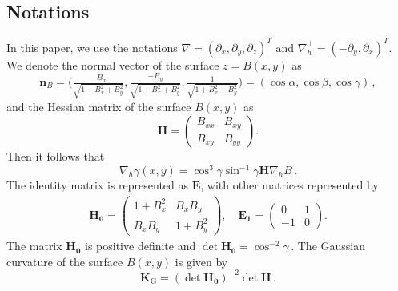 \documentclass[pdflatex,sn-mathphys-num]{sn-jnl}%
\theoremstyle{thmstyleone}%
\theoremstyle{thmstyletwo}%
\theoremstyle{thmstylethree}%
\theoremstyle{thmstyletwo}
\begin{document}
\subsection{Notations}\label{subsec1.1}
In this paper, we use the notations $\nabla=(\partial_x,\partial_y,\partial_z)^T$ and $\nabla^\bot_h=(-\partial_y,\partial_x)^T$. 
We denote the normal vector of the surface $z=B(x,y)$ as
\begin{equation*}
	{\boldsymbol n}_{B}=\Big(\tfrac{-B_x}{\sqrt{1+B_x^2+B_y^2}}, \tfrac{-B_y}{\sqrt{1+B_x^2+B_y^2}},\tfrac{1}{\sqrt{1+B_x^2+B_y^2}}\Big) =(\cos \alpha,\cos \beta,\cos\gamma)\,,
\end{equation*}
and the Hessian matrix of the surface $B(x,y)$  as
\begin{equation*}
	\boldsymbol{H}=\begin{pmatrix}
		B_{xx}&  B_{xy}\\
		B_{xy} & B_{yy}
	\end{pmatrix}.
\end{equation*}
Then it follows that
\begin{equation*}
	\nabla_{ h}\gamma(x,y)={\cos^3\gamma}{\sin^{-1}\gamma}\boldsymbol{H}\nabla_{ h}B\,.
\end{equation*}
The identity matrix is represented as $\boldsymbol{E}$, with other matrices represented by
\begin{align*}
	\boldsymbol{H_0}=
	\begin{pmatrix}
		1+B_x^2& B_xB_y\\
		B_xB_y& 1+B_y^2
	\end{pmatrix},
	\quad
	\boldsymbol{E_1}=
	\begin{pmatrix}
		0&1\\
		-1& 0
	\end{pmatrix}.
\end{align*}
The matrix $ \boldsymbol{H_0} $ is  positive definite and
$
	\det \boldsymbol{H_0}=\cos^{-2}\gamma\,.
$
The Gaussian curvature of the surface $ B(x,y) $ is given by
\begin{equation*}
	\boldsymbol{K}_{\mathrm{G}} = (\det \boldsymbol{H_0})^{-2} \det \boldsymbol{H}\,.
\end{equation*}
\end{document}
